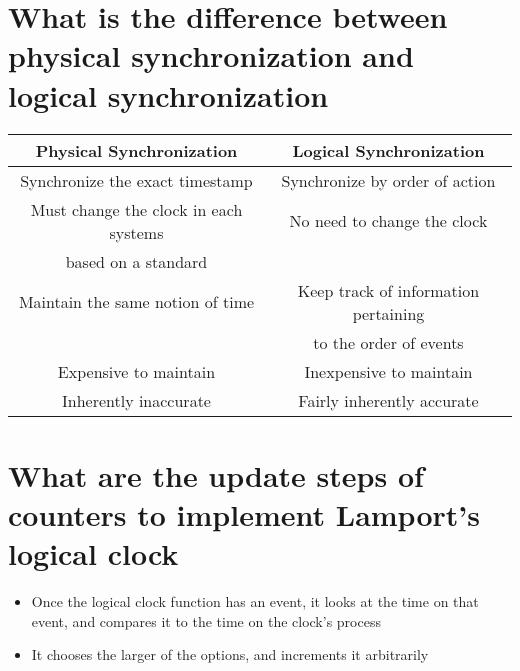 \documentclass[11pt,a4paper]{article}
\begin{document}
\section{What is the difference between physical synchronization and logical synchronization}
\begin{tabular}{|c|c|}
\hline 
Physical Synchronization & Logical Synchronization \\ 
\hline 
Synchronize the exact timestamp & Synchronize by order of action \\ 
\hline 
Must change the clock in each systems & No need to change the clock \\  based on a standard &\\
\hline 
Maintain the same notion of time & Keep track of information pertaining \\ & to the order of events \\ 
\hline 
Expensive to maintain & Inexpensive to maintain \\ 
\hline 
Inherently inaccurate & Fairly inherently accurate \\ 
\hline 
\end{tabular}

\section{What are the update steps of counters to implement Lamport’s logical clock}
\begin{itemize}
	\item Once the logical clock function has an event, it looks at the time on that event, and compares it to the time on the clock’s process
	\item It chooses the larger of the options, and increments it arbitrarily
\end{itemize}
\end{document}
